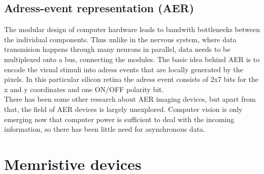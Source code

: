 \documentclass{SeminarV2}
\begin{document}
\subsection{Adress-event representation (AER)}
The modular design of computer hardware leads to bandwith bottlenecks between the individual components. Thus unlike in the nervous system, where data transmision happens through many neurons in parallel, data needs to be multiplexed onto a bus, connecting the modules. The basic idea behind AER is to encode the visual stimuli into adress events that are locally generated by the pixels. In this particular silicon retina the adress event consists of 2x7 bits for the x and y coordinates and one ON/OFF polarity bit.\\
There has been some other research about AER imaging devices, but apart from that, the field of AER devices is largely unexplored. Computer vision is only emerging now that computer power is sufficient to deal with the incoming information, so there has been little need for asynchronous data.
\section{Memristive devices}



\begin{footnotesize}





\end{footnotesize}

\end{document}
